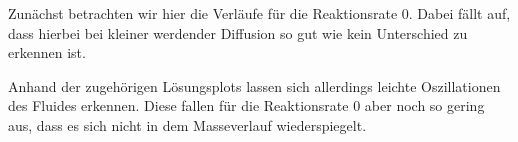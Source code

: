 Zunächst betrachten wir hier die Verläufe für die Reaktionsrate $0$. Dabei fällt auf, dass hierbei bei kleiner werdender Diffusion so gut wie kein Unterschied zu erkennen ist. 

\begin{figure}[H]
	\centering
\end{figure}

Anhand der zugehörigen Lösungsplots lassen sich allerdings leichte Oszillationen des Fluides erkennen. Diese fallen für die Reaktionsrate $0$ aber noch so gering aus, dass es sich nicht in dem Masseverlauf wiederspiegelt.


